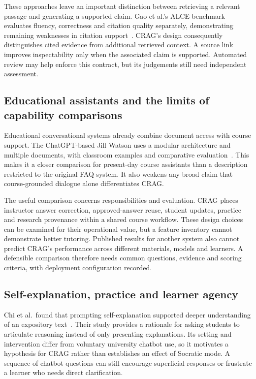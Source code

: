 \documentclass[11pt,a4paper]{article}
\begin{document}
These approaches leave an important distinction between retrieving a relevant passage and generating a supported claim. Gao et al.'s ALCE benchmark evaluates fluency, correctness and citation quality separately, demonstrating remaining weaknesses in citation support~\cite{gao}. CRAG's design consequently distinguishes cited evidence from additional retrieved context. A source link improves inspectability only when the associated claim is supported. Automated review may help enforce this contract, but its judgements still need independent assessment.

\subsection{Educational assistants and the limits of capability comparisons}
Educational conversational systems already combine document access with course support. The ChatGPT-based Jill Watson uses a modular architecture and multiple documents, with classroom examples and comparative evaluation~\cite{taneja}. This makes it a closer comparison for present-day course assistants than a description restricted to the original FAQ system. It also weakens any broad claim that course-grounded dialogue alone differentiates CRAG.

The useful comparison concerns responsibilities and evaluation. CRAG places instructor answer correction, approved-answer reuse, student updates, practice and research provenance within a shared course workflow. These design choices can be examined for their operational value, but a feature inventory cannot demonstrate better tutoring. Published results for another system also cannot predict CRAG's performance across different materials, models and learners. A defensible comparison therefore needs common questions, evidence and scoring criteria, with deployment configuration recorded.

\subsection{Self-explanation, practice and learner agency}
Chi et al.\ found that prompting self-explanation supported deeper understanding of an expository text~\cite{chi}. Their study provides a rationale for asking students to articulate reasoning instead of only presenting explanations. Its setting and intervention differ from voluntary university chatbot use, so it motivates a hypothesis for CRAG rather than establishes an effect of Socratic mode. A sequence of chatbot questions can still encourage superficial responses or frustrate a learner who needs direct clarification.
\end{document}
